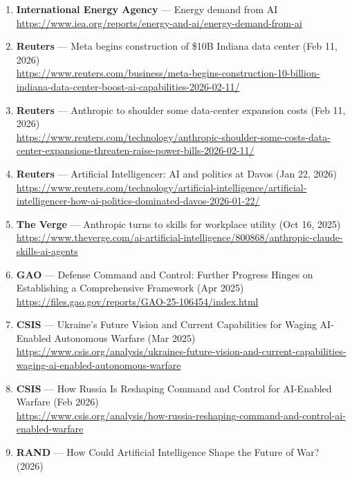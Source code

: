 \documentclass[11pt]{article}
\begin{document}
\begin{enumerate}
  \url{https://www.reuters.com/technology/spacex-nvidia-deals-showing-ai-runs-capital-2026-02-06/}
\item
  \textbf{International Energy Agency} --- Energy demand from AI\\
  \url{https://www.iea.org/reports/energy-and-ai/energy-demand-from-ai}
\item
  \textbf{Reuters} --- Meta begins construction of \$10B Indiana data
  center (Feb 11, 2026)\\
  \url{https://www.reuters.com/business/meta-begins-construction-10-billion-indiana-data-center-boost-ai-capabilities-2026-02-11/}
\item
  \textbf{Reuters} --- Anthropic to shoulder some data-center expansion
  costs (Feb 11, 2026)\\
  \url{https://www.reuters.com/technology/anthropic-shoulder-some-costs-data-center-expansions-threaten-raise-power-bills-2026-02-11/}
\item
  \textbf{Reuters} --- Artificial Intelligencer: AI and politics at
  Davos (Jan 22, 2026)\\
  \url{https://www.reuters.com/technology/artificial-intelligence/artificial-intelligencer-how-ai-politics-dominated-davos-2026-01-22/}
\item
  \textbf{The Verge} --- Anthropic turns to skills for workplace utility
  (Oct 16, 2025)\\
  \url{https://www.theverge.com/ai-artificial-intelligence/800868/anthropic-claude-skills-ai-agents}
\item
  \textbf{GAO} --- Defense Command and Control: Further Progress Hinges
  on Establishing a Comprehensive Framework (Apr 2025)\\
  \url{https://files.gao.gov/reports/GAO-25-106454/index.html}
\item
  \textbf{CSIS} --- Ukraine's Future Vision and Current Capabilities for
  Waging AI-Enabled Autonomous Warfare (Mar 2025)\\
  \url{https://www.csis.org/analysis/ukraines-future-vision-and-current-capabilities-waging-ai-enabled-autonomous-warfare}
\item
  \textbf{CSIS} --- How Russia Is Reshaping Command and Control for
  AI-Enabled Warfare (Feb 2026)\\
  \url{https://www.csis.org/analysis/how-russia-reshaping-command-and-control-ai-enabled-warfare}
\item
  \textbf{RAND} --- How Could Artificial Intelligence Shape the Future
  of War? (2026)\\

\end{enumerate}
\end{document}

